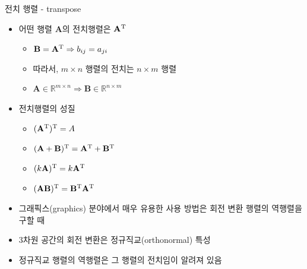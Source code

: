 \begin{frame}{전치 행렬 - transpose}

\begin{itemize}
\item 어떤 행렬 $\mathbf A$의 전치행렬은 $\mathbf A^{\rm T}$
	\begin{itemize}
	\item $\mathbf B = \mathbf A^{\rm T} \Rightarrow b_{ij} = a_{ji}$
	\item 따라서, $m \times n$ 행렬의 전치는 $n \times m$ 행렬
	\item $\mathbf A \in \mathbb R^{m \times n} \Rightarrow \mathbf B \in \mathbb R^{n \times m}$
	\end{itemize}
\item 전치행렬의 성질
	\begin{itemize}
	\item $\mathbf (\mathbf A^{\rm T})^{\rm T} = A$
	\item $(\mathbf A + \mathbf B)^{\rm T} = \mathbf A^{\rm T} + \mathbf B^{\rm T}$
	\item $(k\mathbf A)^{\rm T} = k \mathbf A^{\rm T}$
	\item $(\mathbf {AB})^{\rm T} = \mathbf B^{\rm T} \mathbf A^{\rm T}$
	\end{itemize}
\item 그래픽스(graphics) 분야에서 매우 유용한 사용 방법은 회전 변환 행렬의 역행렬을 구할 때
\item 3차원 공간의 회전 변환은 정규직교(orthonormal) 특성
\item 정규직교 행렬의 역행렬은 그 행렬의 전치임이 알려져 있음
\end{itemize}

\end{frame}



